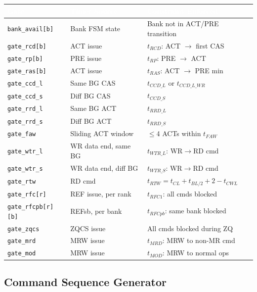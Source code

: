 \documentclass[11pt,a4paper]{article}
\newcommand{\THead}[1]{\cellcolor{navy}\textcolor{white}{\small\textbf{#1}}}
\newcommand{\RA}{\rowcolor{lgray}}
\newcommand{\RB}{\rowcolor{sky!30}}
\begin{document}
\begin{center}
\begin{tabularx}{\linewidth}{@{} l l X @{}}
\toprule
\THead{Gate} & \THead{Timer Source} & \THead{Constraint Enforced} \\
\midrule
\RA \texttt{bank\_avail[b]} & Bank FSM state & Bank not in ACT/PRE transition \\
\RB \texttt{gate\_rcd[b]}   & ACT issue & $t_{RCD}$: ACT $\to$ first CAS \\
\RA \texttt{gate\_rp[b]}    & PRE issue & $t_{RP}$: PRE $\to$ ACT \\
\RB \texttt{gate\_ras[b]}   & ACT issue & $t_{RAS}$: ACT $\to$ PRE min \\
\RA \texttt{gate\_ccd\_l}   & Same BG CAS & $t_{CCD\_L}$ or $t_{CCD\_L\_WR}$ \\
\RB \texttt{gate\_ccd\_s}   & Diff BG CAS & $t_{CCD\_S}$ \\
\RA \texttt{gate\_rrd\_l}   & Same BG ACT & $t_{RRD\_L}$ \\
\RB \texttt{gate\_rrd\_s}   & Diff BG ACT & $t_{RRD\_S}$ \\
\RA \texttt{gate\_faw}      & Sliding ACT window & $\leq$4 ACTs within $t_{FAW}$ \\
\RB \texttt{gate\_wtr\_l}   & WR data end, same BG & $t_{WTR\_L}$: WR$\to$RD cmd \\
\RA \texttt{gate\_wtr\_s}   & WR data end, diff BG & $t_{WTR\_S}$: WR$\to$RD cmd \\
\RB \texttt{gate\_rtw}      & RD cmd & $t_{RTW}=t_{CL}+t_{BL/2}+2-t_{CWL}$ \\
\RA \texttt{gate\_rfc[r]}   & REF issue, per rank & $t_{RFC1}$: all cmds blocked \\
\RB \texttt{gate\_rfcpb[r][b]} & REFsb, per bank & $t_{RFCpb}$: same bank blocked \\
\RA \texttt{gate\_zqcs}     & ZQCS issue & All cmds blocked during ZQ \\
\RB \texttt{gate\_mrd}      & MRW issue & $t_{MRD}$: MRW to non-MR cmd \\
\RA \texttt{gate\_mod}      & MRW issue & $t_{MOD}$: MRW to normal ops \\
\bottomrule
\end{tabularx}
\end{center}

\subsection{Command Sequence Generator}
\end{document}
